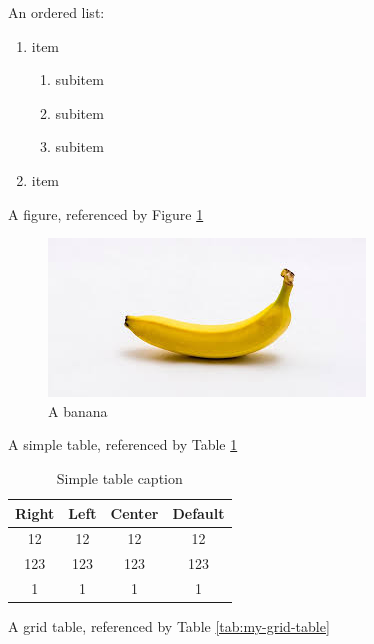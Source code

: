 \documentclass[a4paper, 11pt]{article}
\begin{document}
    An ordered list:

    \begin{enumerate}
        \item item
        \begin{enumerate}
            \item subitem
            \item subitem
            \item subitem
        \end{enumerate}
        \item item
    \end{enumerate}

    A figure, referenced by Figure \ref{fig:banana}

    \begin{figure}[H]
        \centering
        \includegraphics[scale=1.0]{banana.jpg}
        \caption{A banana}
        \label{fig:banana}
    \end{figure}

    A simple table, referenced by Table \ref{tab:my-simple-table}

    \begin{table}[h]
        \caption{Simple table caption}
        \label{tab:my-simple-table}
        \centering
        \begin{tabular}{|c|c|c|c|}
            \hline
            \bfseries{Right} &
            \bfseries{Left} &
            \bfseries{Center} &
            \bfseries{Default} \\
            \hline
            12 &
            12 &
            12 &
            12 \\
            \hline
            123 &
            123 &
            123 &
            123 \\
            \hline
            1 &
            1 &
            1 &
            1 \\
            \hline
        \end{tabular}
    \end{table}

    A grid table, referenced by Table \ref{tab:my-grid-table}
\end{document}

